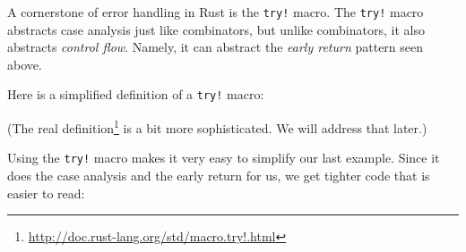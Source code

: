\documentclass[a4paper,]{book}
\newenvironment{Shaded}{\begin{snugshade}}{\end{snugshade}}
\newcommand{\KeywordTok}[1]{\textcolor[rgb]{0.13,0.29,0.53}{\textbf{{#1}}}}
\newcommand{\ConstantTok}[1]{\textcolor[rgb]{0.00,0.00,0.00}{{#1}}}
\newcommand{\PreprocessorTok}[1]{\textcolor[rgb]{0.56,0.35,0.01}{\textit{{#1}}}}
\newcommand{\NormalTok}[1]{{#1}}
\renewcommand{\href}[2]{#2\footnote{\url{#1}}}
\begin{document}

A cornerstone of error handling in Rust is the \texttt{try!} macro. The
\texttt{try!} macro abstracts case analysis just like combinators, but
unlike combinators, it also abstracts \emph{control flow}. Namely, it
can abstract the \emph{early return} pattern seen above.

Here is a simplified definition of a \texttt{try!} macro:


\begin{Shaded}
\end{Shaded}

(The \href{http://doc.rust-lang.org/std/macro.try!.html}{real
definition} is a bit more sophisticated. We will address that later.)

Using the \texttt{try!} macro makes it very easy to simplify our last
example. Since it does the case analysis and the early return for us, we
get tighter code that is easier to read:
\end{document}
